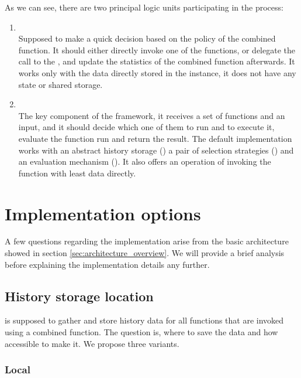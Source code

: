 As we can see, there are two principal logic units participating in the process:

\begin{enumerate}
	\item \textbf{} \\
	Supposed to make a quick decision based on the policy of the combined function. It should either directly invoke one of the functions, or delegate the call to the , and update the statistics of the combined function afterwards. It works only with the data directly stored in the  instance, it does not have any state or shared storage.
	\item \textbf{} \\
	The key component of the framework, it receives a set of functions and an input, and it should decide which one of them to run and to execute it, evaluate the function run and return the result. The default implementation works with an abstract history storage () a pair of selection strategies () and an evaluation mechanism (). It also offers an operation of invoking the function with least data directly.
\end{enumerate}

\section{Implementation options}

A few questions regarding the implementation arise from the basic architecture showed in section \ref{sec:architecture_overview}. We will provide a brief analysis before explaining the implementation details any further.

\subsection{History storage location}
\label{subsec:storing}

 is supposed to gather and store history data for all functions that are invoked using a combined function. The question is, where to save the data and how accessible to make it. We propose three variants.

\subsubsection{Local}

